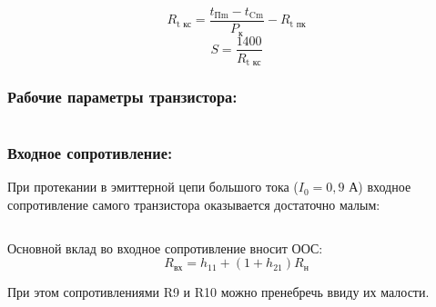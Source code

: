 \begin{equation}
\label{eq:equation2_12}
 R_{\text{t кс}} = \dfrac{t_{\text{Пm}} - t_{\text{Cm}}}{P_{\text{к}}} - R_{\text{t пк}}
\end{equation}
\begin{equation}
\label{eq:equation2_13}
 S = \dfrac{1400}{R_{\text{t кс}}}
\end{equation}
\begin{equation}
\label{eq:equation2_14}
 
\end{equation}
\begin{equation}
\label{eq:equation2_15}
 
\end{equation}

\subsubsection{Рабочие параметры транзистора:}

\begin{equation}
\label{eq:equation2_16}
 
\end{equation}
\begin{equation}
\label{eq:equation2_17}
 
\end{equation}
\begin{equation}
\label{eq:equation2_18}
 
\end{equation}

\subsubsection{Входное сопротивление:}

При протекании в эмиттерной цепи большого тока ($I_0 = 0,9$ А) входное сопротивление самого транзистора оказывается достаточно малым: 

\begin{equation}
\label{eq:equation2_19}
  
\end{equation}

Основной вклад во входное сопротивление вносит ООС:
\begin{equation}
\label{eq:equation2_20}
 R_{\text{вх}} = h_{11} + (1 + h_{21} ) R_{\text{н}}
\end{equation}

При этом сопротивлениями R9 и R10  можно пренебречь ввиду их малости.
\begin{equation*}
  
\end{equation*}

